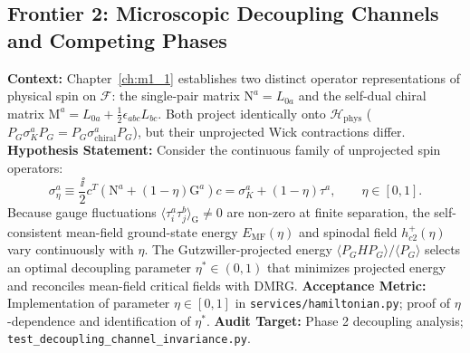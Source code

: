\subsection{Frontier 2: Microscopic Decoupling Channels and Competing Phases}

\begin{contract}
\label{con:h4_decoupling_ambiguity}
\textbf{Context:} Chapter~\ref{ch:m1_1} establishes two distinct operator representations of physical spin on $\mathcal{F}$: the single-pair matrix $\mathrm{N}^a = L_{0a}$ and the self-dual chiral matrix $\mathrm{M}^a = L_{0a} + \frac{1}{2}\epsilon_{abc}L_{bc}$. Both project identically onto $\mathcal{H}_{\mathrm{phys}}$ ($P_G \sigma_K^a P_G = P_G \sigma_{\mathrm{chiral}}^a P_G$), but their unprojected Wick contractions differ.
\textbf{Hypothesis Statement:} Consider the continuous family of unprojected spin operators:
\begin{equation}
\sigma_\eta^a \equiv \frac{\ii}{2} c^T \left( \mathrm{N}^a + (1-\eta) \mathrm{G}^a \right) c = \sigma_K^a + (1-\eta) \tau^a, \qquad \eta \in [0, 1].
\end{equation}
Because gauge fluctuations $\langle \tau_i^a \tau_j^b \rangle_{\mathrm{G}} \neq 0$ are non-zero at finite separation, the self-consistent mean-field ground-state energy $E_{\mathrm{MF}}(\eta)$ and spinodal field $h_{c2}^+(\eta)$ vary continuously with $\eta$. The Gutzwiller-projected energy $\langle P_G H P_G \rangle / \langle P_G \rangle$ selects an optimal decoupling parameter $\eta^* \in (0, 1)$ that minimizes projected energy and reconciles mean-field critical fields with DMRG.
\textbf{Acceptance Metric:} Implementation of parameter $\eta \in [0, 1]$ in \texttt{services/hamiltonian.py}; proof of $\eta$-dependence and identification of $\eta^*$.
\textbf{Audit Target:} Phase 2 decoupling analysis; \texttt{test\_decoupling\_channel\_invariance.py}.
\end{contract}

